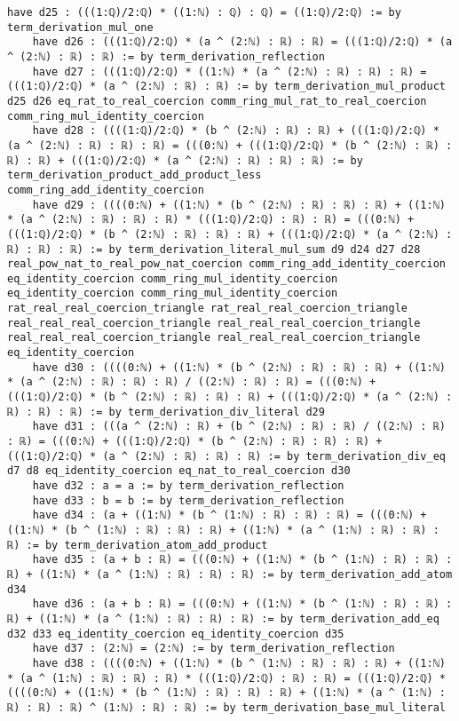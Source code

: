 \documentclass{article}
\begin{document}
\begin{tcolorbox}[colback=white!10, width=\linewidth]
\begin{lstlisting}[language=Lean4]
    have d25 : (((1:ℚ)/2:ℚ) * ((1:ℕ) : ℚ) : ℚ) = ((1:ℚ)/2:ℚ) := by term_derivation_mul_one
    have d26 : (((1:ℚ)/2:ℚ) * (a ^ (2:ℕ) : ℝ) : ℝ) = (((1:ℚ)/2:ℚ) * (a ^ (2:ℕ) : ℝ) : ℝ) := by term_derivation_reflection
    have d27 : (((1:ℚ)/2:ℚ) * ((1:ℕ) * (a ^ (2:ℕ) : ℝ) : ℝ) : ℝ) = (((1:ℚ)/2:ℚ) * (a ^ (2:ℕ) : ℝ) : ℝ) := by term_derivation_mul_product d25 d26 eq_rat_to_real_coercion comm_ring_mul_rat_to_real_coercion comm_ring_mul_identity_coercion
    have d28 : ((((1:ℚ)/2:ℚ) * (b ^ (2:ℕ) : ℝ) : ℝ) + (((1:ℚ)/2:ℚ) * (a ^ (2:ℕ) : ℝ) : ℝ) : ℝ) = (((0:ℕ) + (((1:ℚ)/2:ℚ) * (b ^ (2:ℕ) : ℝ) : ℝ) : ℝ) + (((1:ℚ)/2:ℚ) * (a ^ (2:ℕ) : ℝ) : ℝ) : ℝ) := by term_derivation_product_add_product_less comm_ring_add_identity_coercion
    have d29 : ((((0:ℕ) + ((1:ℕ) * (b ^ (2:ℕ) : ℝ) : ℝ) : ℝ) + ((1:ℕ) * (a ^ (2:ℕ) : ℝ) : ℝ) : ℝ) * (((1:ℚ)/2:ℚ) : ℝ) : ℝ) = (((0:ℕ) + (((1:ℚ)/2:ℚ) * (b ^ (2:ℕ) : ℝ) : ℝ) : ℝ) + (((1:ℚ)/2:ℚ) * (a ^ (2:ℕ) : ℝ) : ℝ) : ℝ) := by term_derivation_literal_mul_sum d9 d24 d27 d28 real_pow_nat_to_real_pow_nat_coercion comm_ring_add_identity_coercion eq_identity_coercion comm_ring_mul_identity_coercion eq_identity_coercion comm_ring_mul_identity_coercion rat_real_real_coercion_triangle rat_real_real_coercion_triangle real_real_real_coercion_triangle real_real_real_coercion_triangle real_real_real_coercion_triangle real_real_real_coercion_triangle eq_identity_coercion
    have d30 : ((((0:ℕ) + ((1:ℕ) * (b ^ (2:ℕ) : ℝ) : ℝ) : ℝ) + ((1:ℕ) * (a ^ (2:ℕ) : ℝ) : ℝ) : ℝ) / ((2:ℕ) : ℝ) : ℝ) = (((0:ℕ) + (((1:ℚ)/2:ℚ) * (b ^ (2:ℕ) : ℝ) : ℝ) : ℝ) + (((1:ℚ)/2:ℚ) * (a ^ (2:ℕ) : ℝ) : ℝ) : ℝ) := by term_derivation_div_literal d29
    have d31 : (((a ^ (2:ℕ) : ℝ) + (b ^ (2:ℕ) : ℝ) : ℝ) / ((2:ℕ) : ℝ) : ℝ) = (((0:ℕ) + (((1:ℚ)/2:ℚ) * (b ^ (2:ℕ) : ℝ) : ℝ) : ℝ) + (((1:ℚ)/2:ℚ) * (a ^ (2:ℕ) : ℝ) : ℝ) : ℝ) := by term_derivation_div_eq d7 d8 eq_identity_coercion eq_nat_to_real_coercion d30
    have d32 : a = a := by term_derivation_reflection
    have d33 : b = b := by term_derivation_reflection
    have d34 : (a + ((1:ℕ) * (b ^ (1:ℕ) : ℝ) : ℝ) : ℝ) = (((0:ℕ) + ((1:ℕ) * (b ^ (1:ℕ) : ℝ) : ℝ) : ℝ) + ((1:ℕ) * (a ^ (1:ℕ) : ℝ) : ℝ) : ℝ) := by term_derivation_atom_add_product
    have d35 : (a + b : ℝ) = (((0:ℕ) + ((1:ℕ) * (b ^ (1:ℕ) : ℝ) : ℝ) : ℝ) + ((1:ℕ) * (a ^ (1:ℕ) : ℝ) : ℝ) : ℝ) := by term_derivation_add_atom d34
    have d36 : (a + b : ℝ) = (((0:ℕ) + ((1:ℕ) * (b ^ (1:ℕ) : ℝ) : ℝ) : ℝ) + ((1:ℕ) * (a ^ (1:ℕ) : ℝ) : ℝ) : ℝ) := by term_derivation_add_eq d32 d33 eq_identity_coercion eq_identity_coercion d35
    have d37 : (2:ℕ) = (2:ℕ) := by term_derivation_reflection
    have d38 : ((((0:ℕ) + ((1:ℕ) * (b ^ (1:ℕ) : ℝ) : ℝ) : ℝ) + ((1:ℕ) * (a ^ (1:ℕ) : ℝ) : ℝ) : ℝ) * (((1:ℚ)/2:ℚ) : ℝ) : ℝ) = (((1:ℚ)/2:ℚ) * ((((0:ℕ) + ((1:ℕ) * (b ^ (1:ℕ) : ℝ) : ℝ) : ℝ) + ((1:ℕ) * (a ^ (1:ℕ) : ℝ) : ℝ) : ℝ) ^ (1:ℕ) : ℝ) : ℝ) := by term_derivation_base_mul_literal

\end{lstlisting}
\end{tcolorbox}
\end{document}
